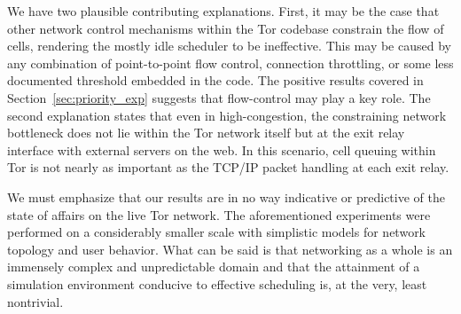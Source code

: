 We have two plausible contributing explanations. First, it may be the case that
other network control mechanisms within the Tor codebase constrain the flow of
cells, rendering the mostly idle scheduler to be ineffective. This may be caused
by any combination of point-to-point flow control, connection throttling, or
some less documented threshold embedded in the code. The positive results
covered in Section~\ref{sec:priority_exp} suggests that flow-control may play a
key role. The second explanation states that even in high-congestion, the
constraining network bottleneck does not lie within the Tor network itself but
at the exit relay interface with external servers on the web. In this scenario,
cell queuing within Tor is not nearly as important as the TCP/IP packet handling
at each exit relay.

We must emphasize that our results are in no way indicative or predictive of the
state of affairs on the live Tor network. The aforementioned experiments were
performed on a considerably smaller scale with simplistic models for network
topology and user behavior. What can be said is that networking as a whole is an
immensely complex and unpredictable domain and that the attainment of a
simulation environment conducive to effective scheduling is, at the very, least
nontrivial.
